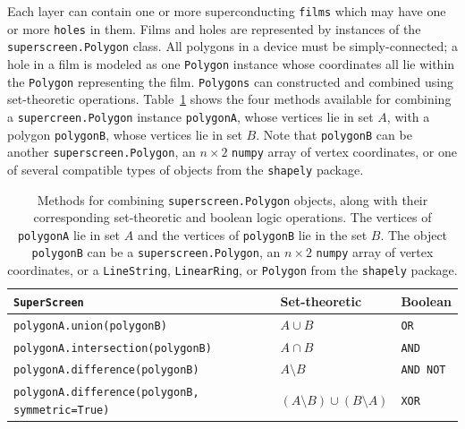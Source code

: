 \documentclass[final,3p,times]{elsarticle}
\newcommand{\inline}[1]{\texttt{#1}\xspace}
\newcommand{\SuperScreen}{\inline{SuperScreen}}
\begin{document}
Each layer can contain one or more superconducting \inline{films} which may have one or more \inline{holes} in them. Films and holes are represented by instances of the \inline{superscreen.Polygon} class. All polygons in a device must be simply-connected; a hole in a film is modeled as one \inline{Polygon} instance whose coordinates all lie within the \inline{Polygon} representing the film.
\inline{Polygons} can constructed and combined using set-theoretic operations. Table~\ref{table:polygon} shows the four methods available for combining a \inline{supercreen.Polygon} instance \inline{polygonA}, whose vertices lie in set $A$, with a polygon \inline{polygonB}, whose vertices lie in set $B$. Note that \inline{polygonB} can be another \inline{superscreen.Polygon}, an $n\times 2$ \inline{numpy} array of vertex coordinates, or one of several compatible types of objects from the \inline{shapely} package.

\begin{table}[h]
\centering
\begin{tabular}{|l|l|l|}
\hline
\SuperScreen                             & Set-theoretic  & Boolean   \\ \hline \hline
\inline{polygonA.union(polygonB)}        & $A\cup B$      & \inline{OR}      \\
\inline{polygonA.intersection(polygonB)} & $A\cap B$      & \inline{AND}     \\
\inline{polygonA.difference(polygonB)}   & $A\setminus B$ & \inline{AND NOT} \\
\inline{polygonA.difference(polygonB, symmetric=True)} & $(A\setminus B)\cup(B\setminus A)$ & \inline{XOR} \\ \hline
\end{tabular}
\caption{Methods for combining \inline{superscreen.Polygon} objects, along with their corresponding set-theoretic and boolean logic operations. The vertices of \inline{polygonA} lie in set $A$ and the vertices of \inline{polygonB} lie in the set $B$. The object \inline{polygonB} can be a \inline{superscreen.Polygon}, an $n\times 2$ \inline{numpy} array of vertex coordinates, or a \inline{LineString}, \inline{LinearRing}, or \inline{Polygon} from the \inline{shapely} package.}
\label{table:polygon}
\end{table}
\end{document}
